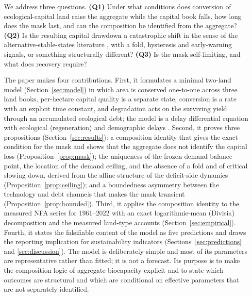 \documentclass[preprint,12pt,authoryear]{elsarticle}
\begin{document}
We address three questions. \textbf{(Q1)} Under what conditions does conversion of ecological-capital land raise the aggregate while the capital book falls, how long does the mask last, and can the composition be identified from the aggregate? \textbf{(Q2)} Is the resulting capital drawdown a catastrophic shift in the sense of the alternative-stable-states literature \citep{Scheffer2001}, with a fold, hysteresis and early-warning signals, or something structurally different? \textbf{(Q3)} Is the mask self-limiting, and what does recovery require?

The paper makes four contributions. First, it formulates a minimal two-land model (Section~\ref{sec:model}) in which area is conserved one-to-one across three land books, per-hectare capital quality is a separate state, conversion is a rate with an explicit time constant, and degradation acts on the surviving yield through an accumulated ecological debt; the model is a delay differential equation with ecological (regeneration) and demographic delays \citep{Kuang1993,Hutchinson1948}. Second, it proves three propositions (Section~\ref{sec:results}): a composition identity that gives the exact condition for the mask and shows that the aggregate does not identify the capital loss (Proposition~\ref{prop:mask}); the uniqueness of the frozen-demand balance point, the location of the demand ceiling, and the absence of a fold and of critical slowing down, derived from the affine structure of the deficit-side dynamics (Proposition~\ref{prop:ceiling}); and a boundedness asymmetry between the technology and debt channels that makes the mask transient (Proposition~\ref{prop:bounded}). Third, it applies the composition identity to the measured NFA series for 1961--2022 with an exact logarithmic-mean (Divisia) decomposition and the measured land-type accounts (Section~\ref{sec:empirical}). Fourth, it states the falsifiable content of the model as five predictions and draws the reporting implication for sustainability indicators (Sections~\ref{sec:predictions} and \ref{sec:discussion}). The model is deliberately simple and most of its parameters are representative rather than fitted; it is not a forecast. Its purpose is to make the composition logic of aggregate biocapacity explicit and to state which outcomes are structural and which are conditional on effective parameters that are not separately identified.
\end{document}
